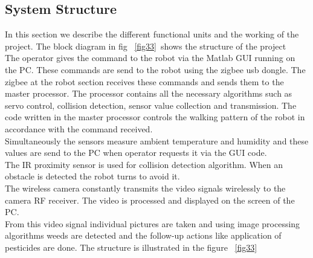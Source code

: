 \documentclass{report}
\begin{document}
\subsection{System Structure}
In this section we describe the different functional units and the  working of the project.
The block diagram in fig ~\ref{fig33}\ shows the structure of the project\\
The operator gives the command to the robot via the Matlab GUI running on the PC. These commands are send to the robot using the zigbee usb dongle. The zigbee at the robot section receives these commands and sends them to the master processor. The processor contains all the necessary algorithms such as servo control, collision detection, sensor value collection and transmission. The code written in the master processor controls the walking pattern of the robot in accordance with the command received.\\
Simultaneously the sensors measure ambient temperature and humidity and these values are send to the PC when operator requests it via the GUI code.\\
The IR proximity sensor is used for collision detection algorithm. When an obstacle is detected the robot turns to avoid it.\\
The wireless camera constantly transmits the video signals wirelessly to the camera RF receiver. The video is processed and displayed on the screen of the PC.\\
From this video signal individual pictures are taken and using image processing algorithms weeds are detected and the follow-up actions like application of pesticides are done. The structure is illustrated in the figure ~\ref{fig33}\\ 
\end{document}
